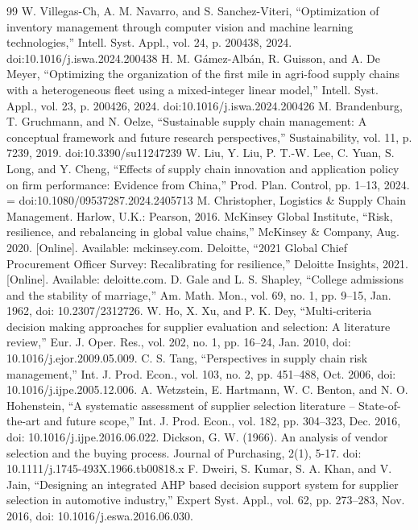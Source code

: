 \documentclass[11pt]{article}
\begin{document}
\clearpage
\begin{thebibliography}{99}
 W. Villegas-Ch, A. M. Navarro, and S. Sanchez-Viteri, ``Optimization of inventory management through computer vision and machine learning technologies,'' Intell. Syst. Appl., vol. 24, p. 200438, 2024. doi:10.1016/j.iswa.2024.200438
 H. M. Gámez-Albán, R. Guisson, and A. De Meyer, ``Optimizing the organization of the first mile in agri-food supply chains with a heterogeneous fleet using a mixed-integer linear model,'' Intell. Syst. Appl., vol. 23, p. 200426, 2024. doi:10.1016/j.iswa.2024.200426
 M. Brandenburg, T. Gruchmann, and N. Oelze, ``Sustainable supply chain management: A conceptual framework and future research perspectives,'' Sustainability, vol. 11, p. 7239, 2019. doi:10.3390/su11247239
 W. Liu, Y. Liu, P. T.-W. Lee, C. Yuan, S. Long, and Y. Cheng, ``Effects of supply chain innovation and application policy on firm performance: Evidence from China,'' Prod. Plan. Control, pp. 1--13, 2024. = doi:10.1080/09537287.2024.2405713
 M. Christopher, Logistics \& Supply Chain Management. Harlow, U.K.: Pearson, 2016.
 McKinsey Global Institute, ``Risk, resilience, and rebalancing in global value chains,'' McKinsey \& Company, Aug. 2020. [Online]. Available: mckinsey.com.
 Deloitte, ``2021 Global Chief Procurement Officer Survey: Recalibrating for resilience,'' Deloitte Insights, 2021. [Online]. Available: deloitte.com.
 D. Gale and L. S. Shapley, ``College admissions and the stability of marriage,'' Am. Math. Mon., vol. 69, no. 1, pp. 9--15, Jan. 1962, doi: 10.2307/2312726.
 W. Ho, X. Xu, and P. K. Dey, ``Multi-criteria decision making approaches for supplier evaluation and selection: A literature review,'' Eur. J. Oper. Res., vol. 202, no. 1, pp. 16--24, Jan. 2010, doi: 10.1016/j.ejor.2009.05.009.
 C. S. Tang, ``Perspectives in supply chain risk management,'' Int. J. Prod. Econ., vol. 103, no. 2, pp. 451--488, Oct. 2006, doi: 10.1016/j.ijpe.2005.12.006.
 A. Wetzstein, E. Hartmann, W. C. Benton, and N. O. Hohenstein, ``A systematic assessment of supplier selection literature -- State-of-the-art and future scope,'' Int. J. Prod. Econ., vol. 182, pp. 304--323, Dec. 2016, doi: 10.1016/j.ijpe.2016.06.022.
 Dickson, G. W. (1966). An analysis of vendor selection and the buying process. Journal of Purchasing, 2(1), 5-17. doi: 10.1111/j.1745-493X.1966.tb00818.x
 F. Dweiri, S. Kumar, S. A. Khan, and V. Jain, ``Designing an integrated AHP based decision support system for supplier selection in automotive industry,'' Expert Syst. Appl., vol. 62, pp. 273--283, Nov. 2016, doi: 10.1016/j.eswa.2016.06.030.

\end{thebibliography}
\end{document}
